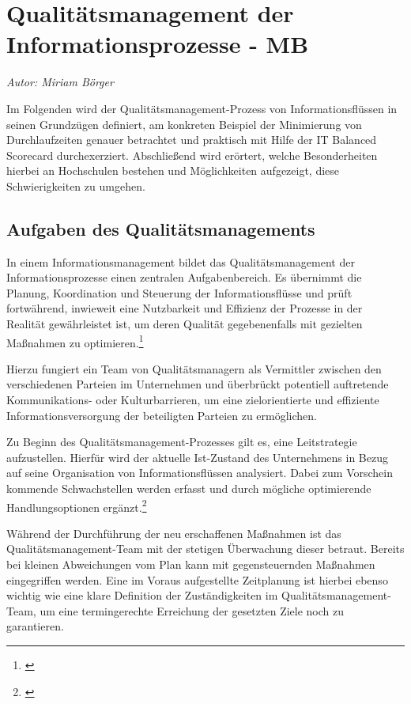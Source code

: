 \section{Qualitätsmanagement der Informationsprozesse - MB}
\textit{Autor: Miriam Börger}


Im Folgenden wird der Qualitätsmanagement-Prozess von Informationsflüssen in seinen Grundzügen definiert, am konkreten Beispiel der Minimierung von Durchlaufzeiten genauer betrachtet und praktisch mit Hilfe der IT Balanced Scorecard durchexerziert. 
Abschließend wird erörtert, welche Besonderheiten hierbei an Hochschulen bestehen und Möglichkeiten aufgezeigt, diese Schwierigkeiten zu umgehen.

\subsection{Aufgaben des Qualitätsmanagements}
In einem Informationsmanagement bildet das Qualitätsmanagement der Informationsprozesse einen zentralen Aufgabenbereich. Es übernimmt die Planung, Koordination und Steuerung der Informationsflüsse und prüft fortwährend, inwieweit eine Nutzbarkeit und Effizienz der Prozesse in der Realität gewährleistet ist, um deren Qualität gegebenenfalls mit gezielten Maßnahmen zu optimieren.\footnote{\cite{schroder_wertorientiertes_2005}}

Hierzu fungiert ein Team von Qualitätsmanagern als Vermittler zwischen den verschiedenen Parteien im Unternehmen und überbrückt potentiell auftretende Kommunikations- oder Kulturbarrieren, um eine zielorientierte und effiziente Informationsversorgung der beteiligten Parteien zu ermöglichen.

Zu Beginn des Qualitätsmanagement-Prozesses gilt es, eine Leitstrategie aufzustellen. Hierfür wird der aktuelle Ist-Zustand des Unternehmens in Bezug auf seine Organisation von Informationsflüssen analysiert. Dabei zum Vorschein kommende Schwachstellen werden erfasst und durch mögliche optimierende Handlungsoptionen ergänzt.\footnote{\cite{helmke_management_2013}}

Während der Durchführung der neu erschaffenen Maßnahmen ist das Qualitätsmanagement-Team mit der stetigen Überwachung dieser betraut. 
Bereits bei kleinen Abweichungen vom Plan kann mit gegensteuernden Maßnahmen eingegriffen werden. 
Eine im Voraus aufgestellte Zeitplanung ist hierbei ebenso wichtig wie eine klare Definition der Zuständigkeiten im Qualitätsmanagement-Team, um eine termingerechte Erreichung der gesetzten Ziele noch zu garantieren.

